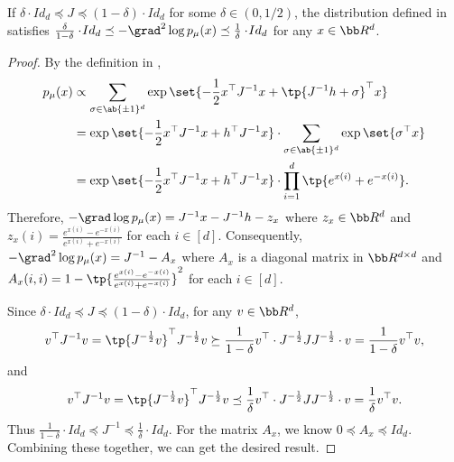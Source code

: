 \begin{lemma}\label{lem:mixture1}
    If $\delta\cdot \!{Id}_d\preceq J\preceq (1-\delta)\cdot \!{Id}_d$ for some $\delta\in (0,1/2)$, the distribution defined in  satisfies $\frac{\delta}{1-\delta}\cdot \!{Id}_d \preceq -\grad^2 \log p_{\mu}(x) \preceq \frac{1}{\delta}\cdot \!{Id}_d$ for any $x\in \bb R^d$.
\end{lemma}
\begin{proof}
    By the definition in , 
    \begin{align*}
        p_{\mu}(x) &\propto \sum_{\sigma\in \ab\{\pm 1\}^d} \exp\set{ - \frac{1}{2}x^{\top}J^{-1}x + \tp{J^{-1}h+\sigma}^{\top}x} \\
        &= \exp\set{ - \frac{1}{2}x^{\top}J^{-1}x + h^{\top}J^{-1}x} \cdot \sum_{\sigma\in \ab\{\pm 1\}^d} \exp\set{\sigma^{\top}x} \\
        &= \exp\set{ - \frac{1}{2}x^{\top}J^{-1}x + h^{\top}J^{-1}x} \cdot \prod_{i=1}^d \tp{e^{x(i)}+e^{-x(i)}}.
    \end{align*}
    Therefore, $-\grad \log p_{\mu}(x) = J^{-1}x - J^{-1}h - z_x$ where $z_x\in \bb R^d$ and $z_x(i) = \frac{e^{x(i)} - e^{-x(i)}}{e^{x(i)} + e^{-x(i)}}$ for each $i\in[d]$. Consequently, $-\grad^2 \log p_{\mu}(x) = J^{-1} - A_x$ where $A_x$ is a diagonal matrix in $\bb R^{d\times d}$ and $A_x(i,i) = 1 - \tp{\frac{e^{x(i)} - e^{-x(i)}}{e^{x(i)} + e^{-x(i)}}}^2$ for each $i\in[d]$.

    Since $\delta\cdot \!{Id}_d\preceq J\preceq (1-\delta)\cdot \!{Id}_d$, for any $v\in \bb R^d$,
    \[
        v^{\top}J^{-1}v = \tp{J^{-\frac{1}{2}}v}^{\top}J^{-\frac{1}{2}}v \succeq \frac{1}{1-\delta}v^{\top}\cdot J^{-\frac{1}{2}} J J^{-\frac{1}{2}}\cdot v=\frac{1}{1-\delta}v^{\top}v,
    \]
    and 
    \[
        v^{\top}J^{-1}v = \tp{J^{-\frac{1}{2}}v}^{\top}J^{-\frac{1}{2}}v \preceq \frac{1}{\delta}v^{\top}\cdot J^{-\frac{1}{2}} J J^{-\frac{1}{2}}\cdot v = \frac{1}{\delta}v^{\top}v.
    \]
    Thus $\frac{1}{1-\delta}\cdot \!{Id}_d\preceq J^{-1}\preceq \frac{1}{\delta}\cdot \!{Id}_d$. For the matrix $A_x$, we know $0\preceq A_x\preceq \!{Id}_d$. Combining these together, we can get the desired result.

\end{proof}

